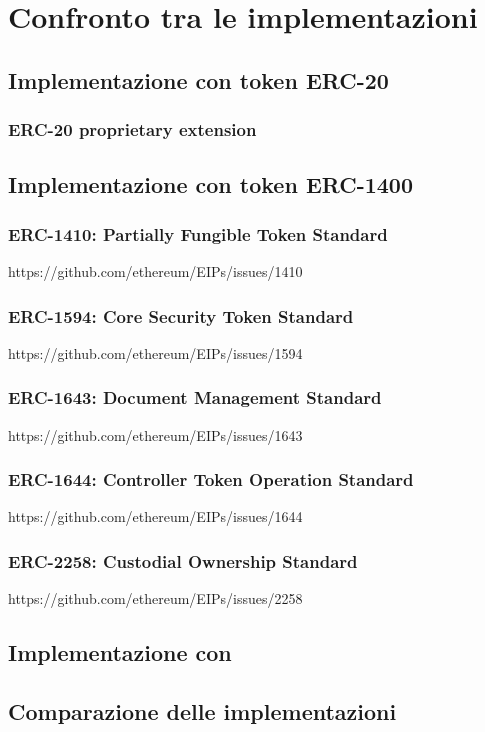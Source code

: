 \chapter{Confronto tra le implementazioni}
\section{Implementazione con token ERC-20}
\subsection{ERC-20 proprietary extension}
\section{Implementazione con token ERC-1400}
\subsection{ERC-1410: Partially Fungible Token Standard}
https://github.com/ethereum/EIPs/issues/1410
\subsection{ERC-1594: Core Security Token Standard}
https://github.com/ethereum/EIPs/issues/1594
\subsection{ERC-1643: Document Management Standard}
https://github.com/ethereum/EIPs/issues/1643
\subsection{ERC-1644: Controller Token Operation Standard}
https://github.com/ethereum/EIPs/issues/1644
\subsection{ERC-2258: Custodial Ownership Standard}
https://github.com/ethereum/EIPs/issues/2258
\section{Implementazione con }
\section{Comparazione delle implementazioni}
